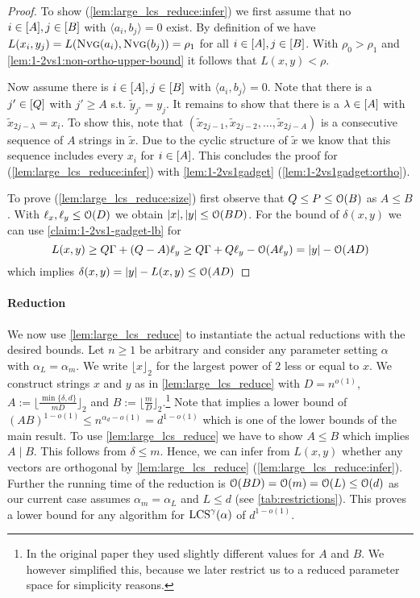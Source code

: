 \begin{proof}
To show (\ref{lem:large_lcs_reduce:infer}) we first assume that no $i \in [A], j \in [B]$ with $\langle a_i, b_j \rangle = 0$ exist.
By definition of \nvgName{} we have $L(x_i, y_j) = L(\text{\textsc{Nvg}}(a_i), \text{\textsc{Nvg}}(b_j)) = \rho_1$ for all $i \in [A], j \in [B]$.
With $\rho_0 > \rho_1$ and \autoref{lem:1-2vs1:non-ortho-upper-bound} it follows that $L(x,y) < \rho$.

Now assume there is $i \in [A], j \in [B]$ with $\langle a_i, b_j \rangle = 0$.
Note that there is a $j' \in [Q]$ with $j' \geq A$ s.t. $\tilde{y}_{j'} = y_j$.
It remains to show that there is a $\lambda \in [A]$ with $\tilde{x}_{2j - \lambda} = x_i$.
To show this, note that $(\tilde{x}_{2j - 1}, \tilde{x}_{2j - 2}, \ldots, \tilde{x}_{2j - A})$ is a consecutive sequence of $A$ strings in $\tilde{x}$.
Due to the cyclic structure of $\tilde{x}$ we know that this sequence includes every $x_i$ for $i \in [A]$.
This concludes the proof for (\ref{lem:large_lcs_reduce:infer}) with \autoref{lem:1-2vs1gadget} (\ref{lem:1-2vs1gadget:ortho}).

To prove (\ref{lem:large_lcs_reduce:size}) first observe that $Q \leq P \leq \mathcal{O}(B)$ as $A \leq B$. With $\ell_x, \ell_y \leq \mathcal{O}(D)$ we obtain $|x|,|y| \leq \mathcal{O}(BD)$.
For the bound of $\delta(x,y)$ we can use \autoref{claim:1-2vs1-gadget-lb} for
\[
L(x,y) \geq Q\Gamma + (Q - A)\ell_y \geq Q\Gamma + Q\ell_y - \mathcal{O}(A\ell_y) = |y| - \mathcal{O}(AD)
\]
which implies $\delta(x,y) = |y| - L(x,y) \leq \mathcal{O}(AD)$
\end{proof}



\paragraph*{Reduction}
We now use \autoref{lem:large_lcs_reduce} to instantiate the actual reductions with the desired bounds.
Let $n \geq 1$ be arbitrary and consider any parameter setting $\alpha$ with $\alpha_L = \alpha_m$.
We write $\lfloor x \rfloor_2$ for the largest power of $2$ less or equal to $x$.
We construct strings $x$ and $y$ as in \autoref{lem:large_lcs_reduce} with $D = n^{o(1)}$, $A := \lfloor \frac{\min\{\delta, d\}}{mD} \rfloor_2$ and $B := \lfloor \frac{m}{D} \rfloor_2$.\footnote{In the original paper they used slightly different values for $A$ and $B$. We however simplified this, because we later restrict us to a reduced parameter space for simplicity reasons.}
Note that \uovh{} implies a lower bound of $(AB)^{1-o(1)} \leq n^{\alpha_d - o(1)} = d^{1 - o(1)}$ which is one of the lower bounds of the main result.
To use \autoref{lem:large_lcs_reduce} we have to show $A \leq B$ which implies $A \mid B$.
This follows from $\delta \leq m$.
Hence, we can infer from $L(x,y)$ whether any vectors are orthogonal by \autoref{lem:large_lcs_reduce} (\ref{lem:large_lcs_reduce:infer}).
Further the running time of the reduction is $\mathcal{O}(BD) = \mathcal{O}(m) = \mathcal{O}(L) \leq \mathcal{O}(d)$ as our current case assumes $\alpha_m = \alpha_L$ and $L \leq d$ (see \autoref{tab:restrictions}).
This proves a lower bound for any algorithm for $\text{LCS}^\gamma(\mathbb{\alpha})$ of $d^{1-o(1)}$.


